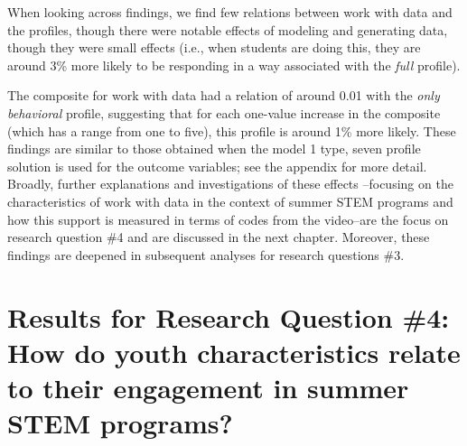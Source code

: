 \documentclass[]{book}
\theoremstyle{definition}
\theoremstyle{definition}
\theoremstyle{definition}
\theoremstyle{remark}
\begin{document}
When looking across findings, we find few relations between work with
data and the profiles, though there were notable effects of modeling and
generating data, though they were small effects (i.e., when students are
doing this, they are around 3\% more likely to be responding in a way
associated with the \emph{full} profile).

\begin{landscape}\begin{table}

\caption{\label{tab:unnamed-chunk-13}Summary of results for research question 3}
\centering
{}
\end{table}
\end{landscape}

The composite for work with data had a relation of around 0.01 with the
\emph{only behavioral} profile, suggesting that for each one-value
increase in the composite (which has a range from one to five), this
profile is around 1\% more likely. These findings are similar to those
obtained when the model 1 type, seven profile solution is used for the
outcome variables; see the appendix for more detail. Broadly, further
explanations and investigations of these effects --focusing on the
characteristics of work with data in the context of summer STEM programs
and how this support is measured in terms of codes from the video--are
the focus on research question \#4 and are discussed in the next
chapter. Moreover, these findings are deepened in subsequent analyses
for research questions \#3.

\section{Results for Research Question \#4: How do youth characteristics
relate to their engagement in summer STEM
programs?}\label{results-for-research-question-4-how-do-youth-characteristics-relate-to-their-engagement-in-summer-stem-programs}
\end{document}
